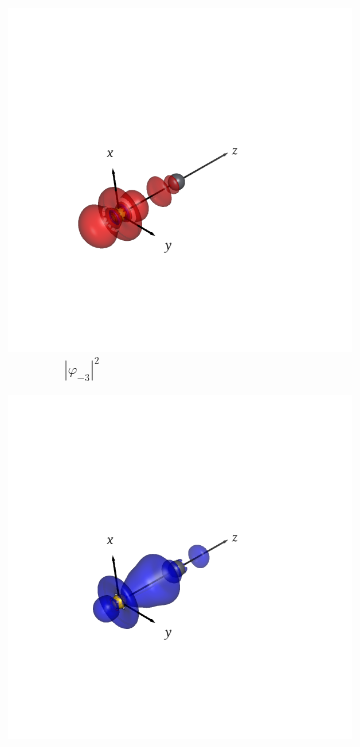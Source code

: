 \documentclass[journal=inoraj,manuscript=article]{achemso}
\begin{document}
\begin{figure}[!h]
    \vspace{0.0cm}
    \begin{subfigure}[t]{0.32\textwidth}
        \centering
        \includegraphics[width=\linewidth]{./AuPb+/nocv-5.png} 
        \caption*{\ \ \ \ \ \ \ \ $|\varphi_{-3}|^2$} 
    \end{subfigure}
    \hfill
    \begin{subfigure}[t]{0.32\textwidth}
        \centering
        \includegraphics[width=\linewidth]{./AuPb+/nocv+5.png} 

\end{subfigure}
\end{figure}
\end{document}
